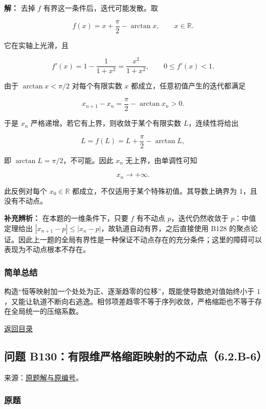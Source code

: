\documentclass[11pt,a4paper]{article}
\begin{document}
\textbf{解：} 去掉 \(f\) 有界这一条件后，迭代可能发散。取

\[
f(x)=x+\frac\pi2-\arctan x,\qquad x\in\mathbb R.
\]

它在实轴上光滑，且

\[
f'(x)=1-\frac1{1+x^2}=\frac{x^2}{1+x^2},
\qquad 0\le f'(x)<1.
\]

由于 \(\arctan x<\pi/2\) 对每个有限实数 \(x\)
都成立，任意初值产生的迭代都满足

\[
x_{n+1}-x_n=\frac\pi2-\arctan x_n>0.
\]

于是 \(x_n\) 严格递增。若它有上界，则收敛于某个有限实数
\(L\)，连续性将给出

\[
L=f(L)=L+\frac\pi2-\arctan L,
\]

即 \(\arctan L=\pi/2\)，不可能。因此 \(x_n\) 无上界，由单调性可知

\[
x_n\longrightarrow+\infty.
\]

此反例对每个 \(x_0\in\mathbb R\)
都成立，不仅适用于某个特殊初值。其导数上确界为 \(1\)，且没有不动点。

\textbf{补充辨析：} 在本题的一维条件下，只要 \(f\) 有不动点
\(p\)，迭代仍然收敛于 \(p\)：中值定理给出
\(|x_{n+1}-p|\le|x_n-p|\)，故轨道自动有界，之后直接使用 B128
的聚点论证。因此上一题的全局有界性是一种保证不动点存在的充分条件；这里的障碍可以表现为不动点根本不存在。

\subsubsection{简单总结}\label{ux7b80ux5355ux603bux7ed3-14}

构造``恒等映射加一个处处为正、逐渐趋零的位移''，既能使导数绝对值始终小于
\(1\)，又能让轨道不断向右逃逸。相邻项差趋零不等于序列收敛，严格缩距也不等于存在全局统一的压缩系数。

\noindent\hyperref[contents]{返回目录}

\subsection{问题
B130：有限维严格缩距映射的不动点（6.2.B-6）}\label{ux95eeux9898-b130ux6709ux9650ux7ef4ux4e25ux683cux7f29ux8dddux6620ux5c04ux7684ux4e0dux52a8ux70b96.2.b-6}

来源：\href{https://zj139.github.io/math-notes/problems/b69d1a64f6e3c089263e7de7/\#问题-b130}{原题解与原编号}。

\subsubsection{原题}\label{ux539fux9898-15}
\end{document}
